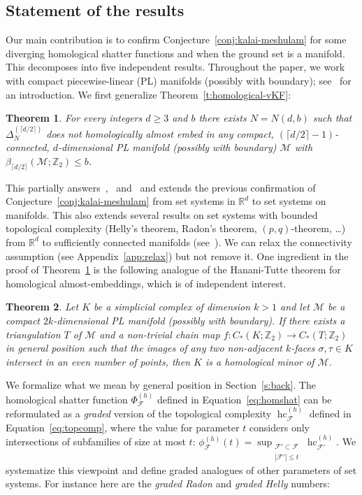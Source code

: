 \documentclass[11pt]{article}
\newcommand{\R}{\mathbb{R}}
\newcommand{\Z}{\mathbb{Z}}
\newcommand{\F}{\mathcal{F}}
\newcommand{\M}{\mathcal{M}}
\DeclareMathOperator{\hc}{hc}
\newcommand{\defn}[1]{\emph{\color{violet}#1}}
\newtheorem{theorem}{Theorem}
\begin{document}
\subsection{Statement of the results}\label{s:results}
%
Our main contribution is to confirm Conjecture~\ref{conj:kalai-meshulam} for some diverging homological shatter functions and when the ground set is a manifold. This decomposes into five independent results.
%
\medskip
%
Throughout the paper, we work with compact piecewise-linear (PL) manifolds (possibly with  boundary); see~\cite[$\mathsection 1$]{Rourke1972IntroductionTP} for an introduction. We first generalize Theorem~\ref{t:homological-vKF}:
%
\begin{theorem}\label{t:forbidden}
For every integers $d \ge 3$ and $b$ there exists $N=N(d,b)$ such that $\Delta_{N}^{(\lceil d/2 \rceil)}$ does not homologically almost embed in any compact, $(\lceil d/2 \rceil-1)$-connected, $d$-dimensional PL manifold (possibly with boundary) $\M$ with $\beta_{\lceil d/2 \rceil}(\M;\Z_2) \le b$.
\end{theorem}
%
\noindent
This partially answers~\cite[Problem~3]{patakova2022bounding},~\cite[Conjecture~1.7]{steppingUp} and~\cite[Conjecture~2]{patak2025sharper} and extends the previous confirmation of Conjecture~\ref{conj:kalai-meshulam} from set systems in $\R^d$ to set systems on manifolds. This also extends several results on set systems with bounded topological complexity (Helly's theorem, Radon's theorem, $(p,q)$-theorem, \ldots) from $\R^d$ to sufficiently connected manifolds (see~\cite{patakova2022bounding,steppingUp}). We can relax the connectivity assumption (see Appendix~\ref{app:relax}) but not remove it.
%
\medskip
%
 One ingredient in the proof of Theorem~\ref{t:forbidden} is the following analogue of the Hanani-Tutte theorem for homological almost-embeddings, which is of independent interest.
%
\begin{theorem}\label{t:HT}
  Let $K$ be a simplicial complex of dimension $k>1$ and let $\M$ be a compact
  $2k$-dimensional PL manifold (possibly with boundary). If there exists a triangulation $T$ of $\M$ and a non-trivial chain map $f:C_*(K; \Z_2)\to C_*(T; \Z_2)$ in
  general position such that the images of any two non-adjacent
  $k$-faces $\sigma,\tau\in K$ intersect in an even number of points,
  then $K$ is a homological minor of $\mathcal{M}$.
\end{theorem}
%
\noindent
We formalize what we mean by general position in Section~\ref{s:back}.
%
\medskip
%
The homological shatter function $\Phi_\F^{(h)}$ defined in Equation~\eqref{eq:homshat} can be reformulated as a \emph{graded} version of the topological complexity $\hc^{(h)}_\F$ defined in Equation~\eqref{eq:topcomp}, where the value for parameter $t$ considers only intersections of subfamilies of size at most $t$: $\phi_\F^{(h)}(t)= \sup_{\substack{\F'\subset\F\\ |\F'| \le t} }\hc^{(h)}_{\F'}$. We systematize this viewpoint and define graded analogues of other parameters of set systems. For instance here are the \defn{graded Radon} and \defn{graded Helly} numbers:
\end{document}
